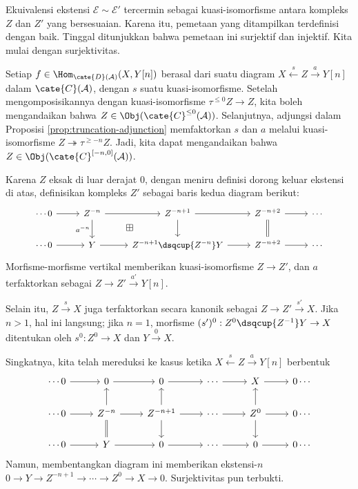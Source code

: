 \begin{bukti}
	Ekuivalensi ekstensi $\mathcal{E} \sim \mathcal{E}'$ tercermin sebagai
	kuasi-isomorfisme antara kompleks $Z$ dan $Z'$ yang bersesuaian. Karena itu,
	pemetaan yang ditampilkan terdefinisi dengan baik. Tinggal ditunjukkan
	bahwa pemetaan ini surjektif dan injektif. Kita mulai dengan surjektivitas.

	Setiap $f \in \Hom_{\cate{D}(\mathcal{A})}(X, Y[n])$ berasal dari suatu
	diagram $X \xleftarrow{s} Z \xrightarrow{a} Y[n]$ dalam
	$\cate{C}(\mathcal{A})$, dengan $s$ suatu kuasi-isomorfisme. Setelah
	mengomposisikannya dengan kuasi-isomorfisme
	$\tau^{\leq 0} Z \to Z$, kita boleh mengandaikan bahwa
	$Z \in \Obj(\cate{C}^{\leq 0}(\mathcal{A}))$. Selanjutnya, adjungsi dalam
	Proposisi \ref{prop:truncation-adjunction} memfaktorkan $s$ dan
	$a$ melalui kuasi-isomorfisme
	$Z \twoheadrightarrow \tau^{\geq -n} Z$. Jadi, kita dapat mengandaikan bahwa
	$Z \in \Obj(\cate{C}^{[-n, 0]}(\mathcal{A}))$.

	Karena $Z$ eksak di luar derajat $0$, dengan meniru definisi dorong keluar
	ekstensi di atas, definisikan kompleks $Z'$ sebagai baris kedua diagram
	berikut:
	\[\begin{tikzcd}[every cell/.append style={font=\small}]
		\cdots 0 \arrow[r] & Z^{-n} \arrow[r] \arrow[d, "{a^{-n}}"'] \arrow[phantom, rd, "\boxplus" description] & Z^{-n+1} \arrow[r] \arrow[d] & Z^{-n+2} \arrow[r] \arrow[equal, d] & \cdots \\
		\cdots 0 \arrow[r] & Y \arrow[r] & Z^{-n+1} \dsqcup{Z^{-n}} Y \arrow[r] & Z^{-n+2} \arrow[r] & \cdots
	\end{tikzcd}\]
	Morfisme-morfisme vertikal memberikan kuasi-isomorfisme $Z \to Z'$, dan
	$a$ terfaktorkan sebagai $Z \to Z' \xrightarrow{a'} Y[n]$.
	
	Selain itu, $Z \xrightarrow{s} X$ juga terfaktorkan secara kanonik sebagai
	$Z \to Z' \xrightarrow{s'} X$. Jika $n > 1$, hal ini langsung; jika
	$n=1$, morfisme
	$(s')^0: Z^0 \dsqcup{Z^{-1}} Y \to X$ ditentukan oleh
	$s^0: Z^0 \to X$ dan $Y \xrightarrow{0} X$.

	Singkatnya, kita telah mereduksi ke kasus ketika
	$X \xleftarrow{s} Z \xrightarrow{a} Y[n]$ berbentuk
	\[\begin{tikzcd}
		\cdots 0 \arrow[r] & 0 \arrow[r] & 0 \arrow[r] & \cdots \arrow[r] & X \arrow[r] & 0 \cdots \\
		\cdots 0 \arrow[r] & Z^{-n} \arrow[r] \arrow[equal, d] \arrow[u] & Z^{-n+1} \arrow[r] \arrow[u] \arrow[d] & \cdots \arrow[r] & Z^0 \arrow[u] \arrow[d] \arrow[r] & 0 \cdots \\
		\cdots 0 \arrow[r] & Y \arrow[r] & 0 \arrow[r] & \cdots \arrow[r] & 0 \arrow[r] & 0 \cdots
	\end{tikzcd}\]
	Namun, membentangkan diagram ini memberikan ekstensi-$n$
	$0 \to Y \to Z^{-n+1} \to \cdots \to Z^0 \to X \to 0$.
	Surjektivitas pun terbukti.


\end{bukti}
